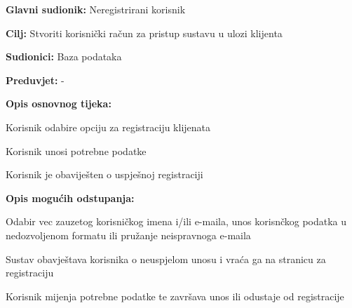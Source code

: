 					\noindent {}
					\begin{packed_item}
	
						\item \textbf{Glavni sudionik:} Neregistrirani korisnik
						\item  \textbf{Cilj:} Stvoriti korisnički račun za pristup sustavu u ulozi klijenta
						\item  \textbf{Sudionici:} Baza podataka
						\item  \textbf{Preduvjet:} -
						\item  \textbf{Opis osnovnog tijeka:}
						
						\item[] \begin{packed_enum}
	
							\item Korisnik odabire opciju za registraciju klijenata
							\item Korisnik unosi potrebne podatke
							\item Korisnik je obaviješten o uspješnoj registraciji
						\end{packed_enum}
						
						\item  \textbf{Opis mogućih odstupanja:}
						
						\item[] \begin{packed_item}
	
							\item[2.a] Odabir vec zauzetog korisničkog imena i/ili e-maila, unos korisnčkog podatka u nedozvoljenom formatu ili pružanje neispravnoga e-maila
							\item[] \begin{packed_enum}
								
								\item Sustav obavještava korisnika o neuspjelom unosu i vraća ga na stranicu za registraciju
								\item Korisnik mijenja potrebne podatke te završava unos ili odustaje od registracije
								
							\end{packed_enum}
							
						\end{packed_item}
					\end{packed_item}
				
